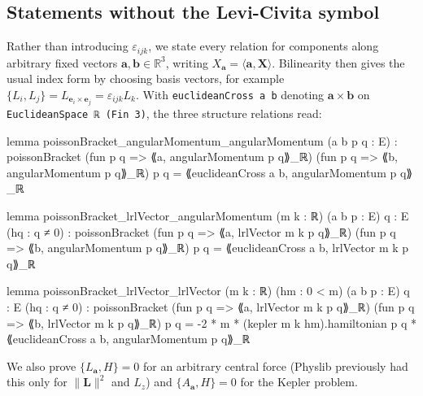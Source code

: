 \documentclass[11pt]{article}
\theoremstyle{definition}
\theoremstyle{remark}
\newcommand{\vL}{\mathbf{L}}
\newcommand{\ip}[2]{\langle #1, #2\rangle}
\begin{document}
\subsection{Statements without the Levi-Civita symbol}

Rather than introducing $\varepsilon_{ijk}$, we state every relation for components along
arbitrary fixed vectors $\mathbf a,\mathbf b\in\mathbb R^3$, writing $X_{\mathbf a}=\ip{\mathbf
a}{\mathbf X}$. Bilinearity then gives the usual index form by choosing basis vectors, for example
$\{L_i,L_j\}=L_{\mathbf e_i\times\mathbf e_j}=\varepsilon_{ijk}L_k$. With
\texttt{euclideanCross a b} denoting $\mathbf a\times\mathbf b$ on \texttt{EuclideanSpace ℝ (Fin 3)},
the three structure relations read:

\begin{lean}
lemma poissonBracket_angularMomentum_angularMomentum (a b p q : E) :
    poissonBracket (fun p q => ⟪a, angularMomentum p q⟫_ℝ)
      (fun p q => ⟪b, angularMomentum p q⟫_ℝ) p q =
      ⟪euclideanCross a b, angularMomentum p q⟫_ℝ

lemma poissonBracket_lrlVector_angularMomentum (m k : ℝ) (a b p : E) {q : E}
    (hq : q ≠ 0) :
    poissonBracket (fun p q => ⟪a, lrlVector m k p q⟫_ℝ)
      (fun p q => ⟪b, angularMomentum p q⟫_ℝ) p q =
      ⟪euclideanCross a b, lrlVector m k p q⟫_ℝ

lemma poissonBracket_lrlVector_lrlVector (m k : ℝ) (hm : 0 < m) (a b p : E) {q : E}
    (hq : q ≠ 0) :
    poissonBracket (fun p q => ⟪a, lrlVector m k p q⟫_ℝ)
      (fun p q => ⟪b, lrlVector m k p q⟫_ℝ) p q =
      -2 * m * (kepler m k hm).hamiltonian p q *
        ⟪euclideanCross a b, angularMomentum p q⟫_ℝ
\end{lean}
We also prove $\{L_{\mathbf a},H\}=0$ for an arbitrary central force (Physlib previously had this
only for $\|\vL\|^2$ and $L_z$) and $\{A_{\mathbf a},H\}=0$ for the Kepler problem.
\end{document}
